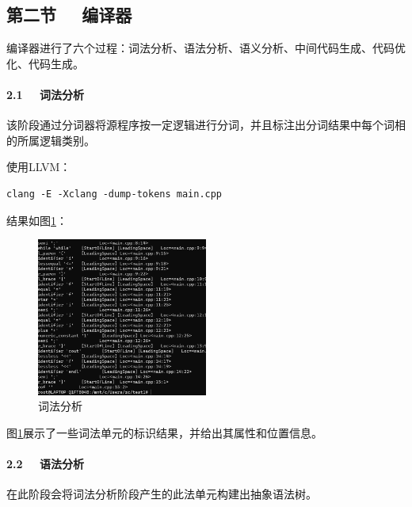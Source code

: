 \documentclass[UTF8,a4paper,10pt]{ctexart}
\begin{document}
\subsection{第二节 \ \ 编译器}
编译器进行了六个过程：词法分析、语法分析、语义分析、中间代码生成、代码优化、代码生成。


\paragraph{2.1 \ \ 词法分析}
该阶段通过分词器将源程序按一定逻辑进行分词，并且标注出分词结果中每个词相的所属逻辑类别。


使用LLVM：
\begin{lstlisting}[frame=trbl]
  clang -E -Xclang -dump-tokens main.cpp
\end{lstlisting}\par
结果如图\ref{fig:3}：
\begin{figure}[H]
    \centering
    \includegraphics[width=0.5\textwidth,height=0.5\textwidth]{imgs/词法.png}
    \caption{词法分析}
    \label{fig:3}
\end{figure}
图\ref{fig:3}展示了一些词法单元的标识结果，并给出其属性和位置信息。

\paragraph{2.2 \ \ 语法分析}
在此阶段会将词法分析阶段产生的此法单元构建出抽象语法树。
\end{document}
